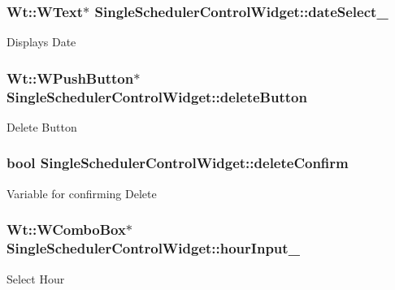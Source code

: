 \subsubsection[{\texorpdfstring{date\+Select\+\_\+}{dateSelect_}}]{\setlength{\rightskip}{0pt plus 5cm}Wt\+::\+W\+Text$\ast$ Single\+Scheduler\+Control\+Widget\+::date\+Select\+\_\+\hspace{0.3cm}{\ttfamily [private]}}\hypertarget{classSingleSchedulerControlWidget_a42e8c83f6d9c385f217d1bbd1e6e5038}{}\label{classSingleSchedulerControlWidget_a42e8c83f6d9c385f217d1bbd1e6e5038}
Displays Date 
\subsubsection[{\texorpdfstring{delete\+Button}{deleteButton}}]{\setlength{\rightskip}{0pt plus 5cm}Wt\+::\+W\+Push\+Button$\ast$ Single\+Scheduler\+Control\+Widget\+::delete\+Button\hspace{0.3cm}{\ttfamily [private]}}\hypertarget{classSingleSchedulerControlWidget_ad90ddf9ce495e587d6457cda5422858c}{}\label{classSingleSchedulerControlWidget_ad90ddf9ce495e587d6457cda5422858c}
Delete Button 
\subsubsection[{\texorpdfstring{delete\+Confirm}{deleteConfirm}}]{\setlength{\rightskip}{0pt plus 5cm}bool Single\+Scheduler\+Control\+Widget\+::delete\+Confirm\hspace{0.3cm}{\ttfamily [private]}}\hypertarget{classSingleSchedulerControlWidget_a194a0b611fadec029f0e7c55154ed903}{}\label{classSingleSchedulerControlWidget_a194a0b611fadec029f0e7c55154ed903}
Variable for confirming Delete 
\subsubsection[{\texorpdfstring{hour\+Input\+\_\+}{hourInput_}}]{\setlength{\rightskip}{0pt plus 5cm}Wt\+::\+W\+Combo\+Box$\ast$ Single\+Scheduler\+Control\+Widget\+::hour\+Input\+\_\+\hspace{0.3cm}{\ttfamily [private]}}\hypertarget{classSingleSchedulerControlWidget_a058831973716290b1ca72bb40d3cc4eb}{}\label{classSingleSchedulerControlWidget_a058831973716290b1ca72bb40d3cc4eb}
Select Hour 
